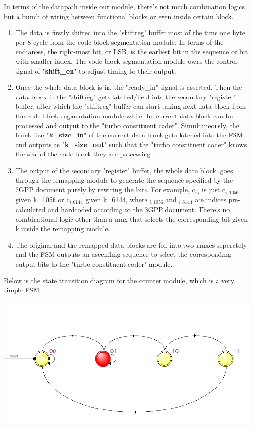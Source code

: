 \documentclass[letterpaper, 12pt]{article} %
\begin{document}
In terms of the datapath inside our module, there's not much combination logics but a bunch of wiring between functional blocks or even inside certain block. 

\begin{enumerate}
    \item The data is firstly shifted into the "shiftreg" buffer most of the time one byte per 8 cycle from the code block segmentation module. In terms of the endianess, the right-most bit, or LSB, is the earliest bit in the sequence or bit with smaller index. The code block segmentation module owns the control signal of "{\bf shift\_en}" to adjust timing to their output.
    \item Once the whole data block is in, the "ready\_in" signal is asserted. Then the data block in the "shiftreg" gets latched/held into the secondary "register" buffer, after which the "shiftreg" buffer can start taking next data block from the code block segmentation module while the current data block can be processed and output to the "turbo constituent coder". Simultaneously, the block size "{\bf k\_size\_in}" of the current data block gets latched into the FSM and outputs as "{\bf k\_size\_out}" such that the "turbo constituent coder" knows the size of the code block they are processing.
    \item The output of the secondary "register" buffer, the whole data block, goes through the remapping module to generate the sequence specified by the 3GPP document purely by rewiring the bits. For example, c$_{\pi i}$ is just c$_{i,1056}$ given k=1056 or c$_{i,6144}$ given k=6144, where $_{i,1056}$ and $_{i,6144}$ are indices pre-calculated and hardcoded according to the 3GPP document. There's no combinational logic other than a mux that selects the corresponding bit given k inside the remapping module.
    \item The original and the remapped data blocks are fed into two muxes seperately and the FSM outputs an ascending sequence to select the corresponding output bits to the "turbo constituent coder" module.
\end{enumerate}

Below is the state transition diagram for the counter module, which is a very simple FSM.

\begin{minipage}{1.0\textwidth}
\includegraphics[width=14cm, angle=0]{files/states.png}
\centering
{}
\centering
\end{minipage}
\bigskip
\end{document}
